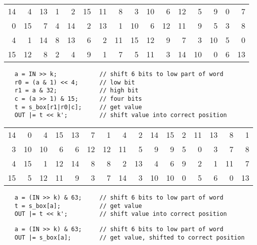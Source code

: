 
\topmargin      -1.0cm
\oddsidemargin   0.0cm
\evensidemargin  0.0cm
\textwidth       6.5in
\textheight      9.0in



\Large

\begin{center}
\begin{tabular}{|r r r r r r r r r r r r r r r r|}
\hline
14 & 4 & 13 & 1 & 2 & 15 & 11 & 8 & 3 & 10 & 6 & 12 & 5 & 9 & 0 & 7 \\
0 & 15 & 7 & 4 & 14 & 2 & 13 & 1 & 10 & 6 & 12 & 11 & 9 & 5 & 3 & 8 \\
4 & 1 & 14 & 8 & 13 & 6 & 2 & 11 & 15 & 12 & 9 & 7 & 3 & 10 & 5 & 0 \\
15 & 12 & 8 & 2 & 4 & 9 & 1 & 7 & 5 & 11 & 3 & 14 & 10 & 0 & 6 & 13 \\
\hline
\end{tabular}
\end{center}

\vskip 0.5in

\begin{verbatim}
   a = IN >> k;            // shift 6 bits to low part of word
   r0 = (a & 1) << 4;      // low bit
   r1 = a & 32;            // high bit
   c = (a >> 1) & 15;      // four bits
   t = s_box[r1|r0|c];     // get value
   OUT |= t << k';         // shift value into correct position
\end{verbatim}
\vskip 0.5in


\begin{center}
\begin{tabular}{|r r r r r r r r r r r r r r r r|}
\hline
14 & 0 & 4 & 15 & 13 & 7 & 1 & 4 & 2 & 14 & 15 & 2 & 11 & 13 & 8 & 1 \\
3 & 10 & 10 & 6 & 6 & 12 & 12 & 11 & 5 & 9 & 9 & 5 & 0 & 3 & 7 & 8 \\
4 & 15 & 1 & 12 & 14 & 8 & 8 & 2 & 13 & 4 & 6 & 9 & 2 & 1 & 11 & 7  \\
15 & 5 & 12 & 11 & 9 & 3 & 7 & 14 & 3 & 10 & 10 & 0 & 5 & 6 & 0 & 13 \\
\hline
\end{tabular}
\end{center}
\vskip 0.5in


\begin{verbatim}
   a = (IN >> k) & 63;     // shift 6 bits to low part of word
   t = s_box[a];           // get value
   OUT |= t << k';         // shift value into correct position
\end{verbatim}

\vskip 0.5in


\begin{verbatim}
   a = (IN >> k) & 63;     // shift 6 bits to low part of word
   OUT |= s_box[a];        // get value, shifted to correct position
\end{verbatim}


